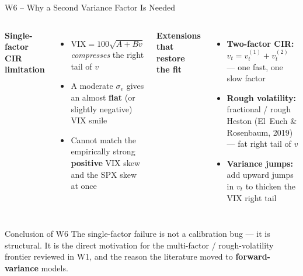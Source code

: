 \documentclass[aspectratio=169, 11pt]{beamer}
\begin{document}
\begin{frame}{W6 -- Why a Second Variance Factor Is Needed}

\begin{columns}[T]
\textbf{Single-factor CIR limitation}
\begin{itemize}
  \item $\mathrm{VIX} = 100\sqrt{A + Bv}$ \textit{compresses} the right tail of $v$
  \item A moderate $\sigma_v$ gives an almost \textbf{flat} (or slightly negative) VIX smile
  \item Cannot match the empirically strong \textbf{positive} VIX skew and the SPX skew at once
\end{itemize}

\textbf{Extensions that restore the fit}
\begin{itemize}
  \item \textbf{Two-factor CIR:} $v_t = v_t^{(1)} + v_t^{(2)}$ --- one fast, one slow factor
  \item \textbf{Rough volatility:} fractional / rough Heston (El~Euch \& Rosenbaum, 2019) --- fat right tail of $v$
  \item \textbf{Variance jumps:} add upward jumps in $v_t$ to thicken the VIX right tail
\end{itemize}
\end{columns}

\vspace{6pt}
\begin{block}{Conclusion of W6}
\small
The single-factor failure is not a calibration bug --- it is structural. It is the
direct motivation for the multi-factor / rough-volatility frontier reviewed in W1, and
the reason the literature moved to \textbf{forward-variance} models.
\end{block}
\end{frame}
\end{document}
